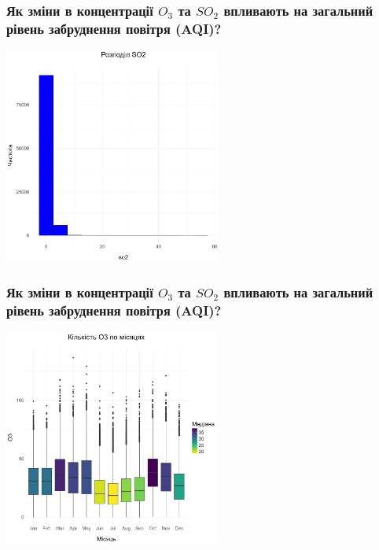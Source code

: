 \documentclass{beamer}
\begin{document}
\begin{frame}
  \frametitle{Як зміни в концентрації $O_3$ та $SO_2$ впливають на загальний рівень забруднення повітря (AQI)?}

  \begin{center}
    \includegraphics[height=2.8in]{plots/question2/so2_plot.png}
  \end{center}
\end{frame}

\begin{frame}
  \frametitle{Як зміни в концентрації $O_3$ та $SO_2$ впливають на загальний рівень забруднення повітря (AQI)?}

  \begin{center}
    \includegraphics[height=2.8in]{plots/question2/seasonal_o3.png}
  \end{center}
\end{frame}
\end{document}
